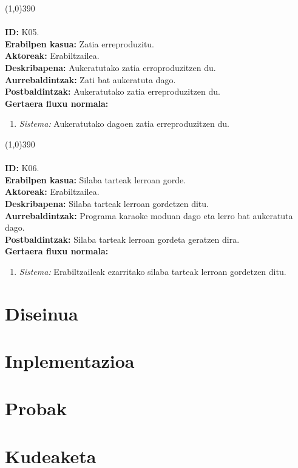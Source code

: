 \line(1,0){390}\\
\noindent\\
\textbf{ID:} K05.\\
\textbf{Erabilpen kasua:} Zatia erreproduzitu.\\
\textbf{Aktoreak:} Erabiltzailea.\\
\textbf{Deskribapena:} Aukeratutako zatia erroproduzitzen du.\\
\textbf{Aurrebaldintzak:} Zati bat aukeratuta dago.\\
\textbf{Postbaldintzak:} Aukeratutako zatia erreproduzitzen du.\\
\textbf{Gertaera fluxu normala:}
\begin{enumerate}
	\item \textit{Sistema:} Aukeratutako dagoen zatia erreproduzitzen du.
\end{enumerate}
\line(1,0){390}\\
\noindent\\
\textbf{ID:} K06.\\
\textbf{Erabilpen kasua:} Silaba tarteak lerroan gorde.\\
\textbf{Aktoreak:} Erabiltzailea.\\
\textbf{Deskribapena:} Silaba tarteak lerroan gordetzen ditu.\\
\textbf{Aurrebaldintzak:} Programa karaoke moduan dago eta lerro bat aukeratuta dago.\\
\textbf{Postbaldintzak:} Silaba tarteak lerroan gordeta geratzen dira.\\
\textbf{Gertaera fluxu normala:}
\begin{enumerate}
	\item \textit{Sistema:} Erabiltzaileak ezarritako silaba tarteak lerroan gordetzen ditu.
\end{enumerate}

\section{Diseinua}

\section{Inplementazioa}

\section{Probak}

\section{Kudeaketa}